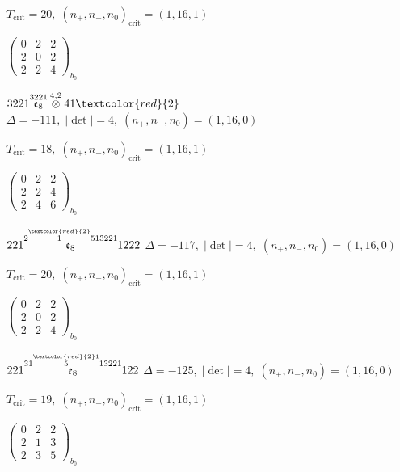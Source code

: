 \documentclass[10pt]{article}
\begin{document}
\hspace{1em}$T_{\text{crit}}=20,\; (n_+,n_-,n_0)_{\text{crit}}=(1,16,1)$

\hspace{2em}$\left(\begin{smallmatrix}0 & 2 & 2 \\ 2 & 0 & 2 \\ 2 & 2 & 4\end{smallmatrix}\right)_{\!b_0}$

$3221\overset{3221}{\mathfrak{e}_8}\overset{4,2}{\otimes}41\textcolor{red}{2}$ \quad $\Delta=-111,\; |\det|=4,\; (n_+,n_-,n_0)=(1,16,0)$

\hspace{1em}$T_{\text{crit}}=18,\; (n_+,n_-,n_0)_{\text{crit}}=(1,16,1)$

\hspace{2em}$\left(\begin{smallmatrix}0 & 2 & 2 \\ 2 & 2 & 4 \\ 2 & 4 & 6\end{smallmatrix}\right)_{\!b_0}$

\smallskip

$221\overset{2\overset{\textcolor{red}{2}}{1}513221}{\mathfrak{e}_8}1222$ \quad $\Delta=-117,\; |\det|=4,\; (n_+,n_-,n_0)=(1,16,0)$

\hspace{1em}$T_{\text{crit}}=20,\; (n_+,n_-,n_0)_{\text{crit}}=(1,16,1)$

\hspace{2em}$\left(\begin{smallmatrix}0 & 2 & 2 \\ 2 & 0 & 2 \\ 2 & 2 & 4\end{smallmatrix}\right)_{\!b_0}$

\smallskip

$221\overset{31\overset{\textcolor{red}{2}1}{5}13221}{\mathfrak{e}_8}122$ \quad $\Delta=-125,\; |\det|=4,\; (n_+,n_-,n_0)=(1,16,0)$

\hspace{1em}$T_{\text{crit}}=19,\; (n_+,n_-,n_0)_{\text{crit}}=(1,16,1)$

\hspace{2em}$\left(\begin{smallmatrix}0 & 2 & 2 \\ 2 & 1 & 3 \\ 2 & 3 & 5\end{smallmatrix}\right)_{\!b_0}$
\end{document}
